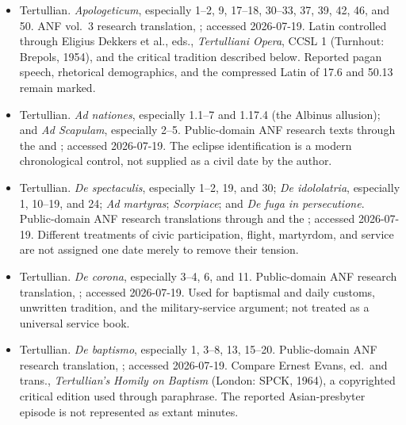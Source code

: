 \begin{itemize}
\item Tertullian. \emph{Apologeticum}, especially 1--2, 9, 17--18, 30--33,
37, 39, 42, 46, and 50. ANF vol.~3 research translation,
;
accessed 2026-07-19. Latin controlled through Eligius Dekkers et al., eds.,
\emph{Tertulliani Opera}, CCSL 1 (Turnhout: Brepols, 1954), and the critical
tradition described below. Reported pagan speech, rhetorical demographics, and
the compressed Latin of 17.6 and 50.13 remain marked.

\item Tertullian. \emph{Ad nationes}, especially 1.1--7 and 1.17.4 (the
Albinus allusion); and \emph{Ad Scapulam}, especially 2--5. Public-domain ANF research
texts through the
 and
; accessed 2026-07-19. The eclipse identification is a modern
chronological control, not supplied as a civil date by the author.

\item Tertullian. \emph{De spectaculis}, especially 1--2, 19, and 30;
\emph{De idololatria}, especially 1, 10--19, and 24; \emph{Ad martyras};
\emph{Scorpiace}; and \emph{De fuga in persecutione}. Public-domain ANF
research translations through
and the
; accessed 2026-07-19. Different treatments of civic participation,
flight, martyrdom, and service are not assigned one date merely to remove their
tension.

\item Tertullian. \emph{De corona}, especially 3--4, 6, and 11. Public-domain ANF
research translation,
; accessed
2026-07-19. Used for baptismal and daily customs, unwritten tradition, and the
military-service argument; not treated as a universal service book.

\item Tertullian. \emph{De baptismo}, especially 1, 3--8, 13, 15--20.
Public-domain ANF research translation,
; accessed
2026-07-19. Compare Ernest Evans, ed.~and trans., \emph{Tertullian's Homily on
Baptism} (London: SPCK, 1964), a copyrighted critical edition used through
paraphrase. The reported Asian-presbyter episode is not represented as extant
minutes.


\end{itemize}
